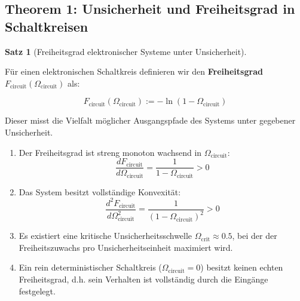 \documentclass[a4paper, 12pt, twoside, openright]{report}
\theoremstyle{definition}
\theoremstyle{definition}
\newtheorem{satz}{Satz}[chapter]
\begin{document}
\subsection*{Theorem 1: Unsicherheit und Freiheitsgrad in Schaltkreisen}

\begin{satz}[Freiheitsgrad elektronischer Systeme unter Unsicherheit]
\label{satz:freiheit_circuit}

Für einen elektronischen Schaltkreis definieren wir den \textbf{Freiheitsgrad} $F_{\text{circuit}}(\Omega_{\text{circuit}})$ als:

\begin{equation}
F_{\text{circuit}}(\Omega_{\text{circuit}}) := -\ln(1 - \Omega_{\text{circuit}})
\end{equation}

Dieser misst die Vielfalt möglicher Ausgangspfade des Systems unter gegebener Unsicherheit.

\begin{enumerate}
    \item Der Freiheitsgrad ist streng monoton wachsend in $\Omega_{\text{circuit}}$:
    \begin{equation}
    \frac{dF_{\text{circuit}}}{d\Omega_{\text{circuit}}} = \frac{1}{1 - \Omega_{\text{circuit}}} > 0
    \end{equation}
    
    \item Das System besitzt vollständige Konvexität:
    \begin{equation}
    \frac{d^2F_{\text{circuit}}}{d\Omega_{\text{circuit}}^2} = \frac{1}{(1 - \Omega_{\text{circuit}})^2} > 0
    \end{equation}
    
    \item Es existiert eine kritische Unsicherheitsschwelle $\Omega_{\text{crit}} \approx 0.5$, bei der der Freiheitszuwachs pro Unsicherheitseinheit maximiert wird.
    
    \item Ein rein deterministischer Schaltkreis ($\Omega_{\text{circuit}} = 0$) besitzt keinen echten Freiheitsgrad, d.h. sein Verhalten ist vollständig durch die Eingänge festgelegt.
\end{enumerate}

\end{satz}
\end{document}
